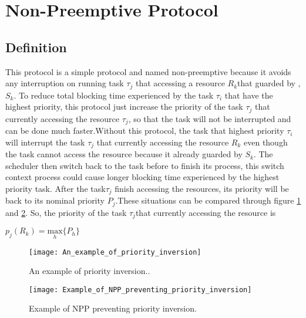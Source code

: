 \section{Non-Preemptive Protocol}

\subsection{Definition}

This protocol is a simple protocol and named non-preemptive because it avoids any interruption on running task $\tau_{j}$ that accessing a resource $ R_{k} $that guarded by , $ S_{k} $. To reduce total blocking time experienced by the task $\tau_{i}$ that have the highest priority, this protocol just increase the priority of the task $\tau_{j}$ that currently accessing the resource $\tau_{j}$, so that the task will not be interrupted and can be done much faster.Without this protocol, the task that highest priority $\tau_{i}$ will interrupt the task $\tau_{j}$ that currently accessing the resource $ R_{k} $ even though the task cannot access the resource because it already guarded by $ S_{k} $. The scheduler then switch back to the task before to finish its process, this switch context process could cause longer blocking time experienced by the highest priority task. After the task$\tau_{j}$ finish accessing the resources, its priority will be back to its nominal priority $ P_{j} $.These situations can be compared through figure \ref{fig:An_example_of_priority_inversion} and \ref{fig:Example_of_NPP_preventing_priority_inversion}. So, the priority of the task $\tau_{j}$that currently accessing the resource is 

\begin{center}
$p_{j}(R_{k})=\underset{h}{\mathrm{max}} \{P_{h}\}  $ \cite{b5}

\end{center}

\begin{figure}[h]
    \centering
    \texttt{[image: An\_example\_of\_priority\_inversion]}
    \caption{An example of priority inversion.. \cite{b5}}
    \label{fig:An_example_of_priority_inversion}
\end{figure}

\begin{figure}[h]
    \centering
    \texttt{[image: Example\_of\_NPP\_preventing\_priority\_inversion]}
    \caption{Example of NPP preventing priority inversion. \cite{b5}}
    \label{fig:Example_of_NPP_preventing_priority_inversion}
\end{figure}


